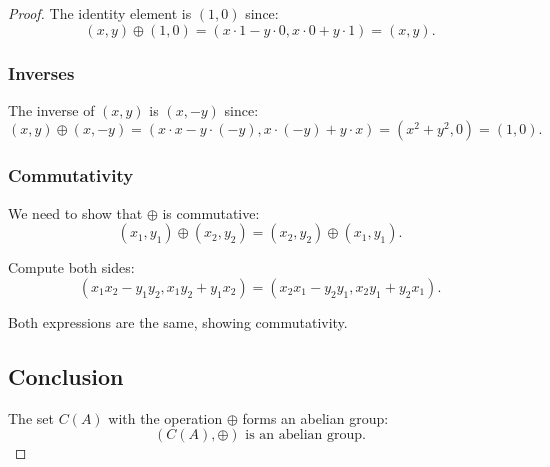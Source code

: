 \documentclass[12pt]{amsart}
\theoremstyle{definition}
\numberwithin{equation}{section}
\begin{document}
\begin{exercise}{4}
\begin{proof}
    The identity element is \((1, 0)\) since:
    \[
    (x, y) \oplus (1, 0) = (x \cdot 1 - y \cdot 0, x \cdot 0 + y \cdot 1) = (x, y).
    \]
    
    \subsubsection*{Inverses}
    
    The inverse of \((x, y)\) is \((x, -y)\) since:
    \[
    (x, y) \oplus (x, -y) = (x \cdot x - y \cdot (-y), x \cdot (-y) + y \cdot x) = (x^2 + y^2, 0) = (1, 0).
    \]
    
    \subsubsection*{Commutativity}
    
    We need to show that \(\oplus\) is commutative:
    \[
    (x_1, y_1) \oplus (x_2, y_2) = (x_2, y_2) \oplus (x_1, y_1).
    \]
    
    Compute both sides:
    \[
    (x_1 x_2 - y_1 y_2, x_1 y_2 + y_1 x_2) = (x_2 x_1 - y_2 y_1, x_2 y_1 + y_2 x_1).
    \]
    
    Both expressions are the same, showing commutativity.
    
    
    \subsection*{Conclusion}
    
    The set \(C(A)\) with the operation \(\oplus\) forms an abelian group:
    \[
        (C(A), \oplus) \text{ is an abelian group.}
        \]
        
    \end{proof}
    \end{exercise}
    \newpage
    
\end{document}
